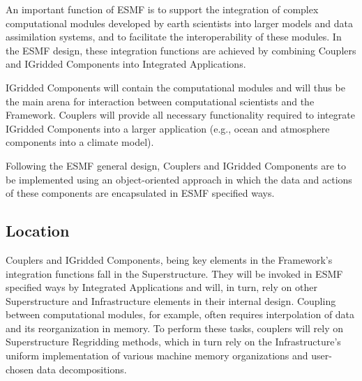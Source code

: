 




An important function of ESMF is to support the integration of
complex computational modules developed by earth scientists into
larger models and data assimilation systems, and to facilitate
the interoperability of these modules. 
In the ESMF design, these integration functions 
are achieved by combining Couplers
and IGridded Components into Integrated Applications.

IGridded Components will contain the 
computational modules and will thus be the main arena for interaction
between computational scientists and the Framework.  Couplers will
provide all necessary functionality required to integrate IGridded Components
into a larger application (e.g., ocean and atmosphere components into
a climate model).

Following the ESMF general design, Couplers and IGridded Components
are to be implemented using an object-oriented approach  
in which the data and actions of these components are encapsulated in 
ESMF specified ways.

\subsection{Location}

Couplers and IGridded Components, being key elements in the
Framework's integration functions fall in the Superstructure.
They will be invoked in ESMF specified ways by Integrated Applications 
and will, in turn, rely on other Superstructure and Infrastructure
elements in their internal design.  Coupling between computational
modules, for example, often requires interpolation of data and
its reorganization in memory. To perform these tasks, couplers will
rely on Superstructure Regridding methods, which in turn rely on the 
Infrastructure's uniform  implementation of various machine memory
organizations and user-chosen data decompositions.




